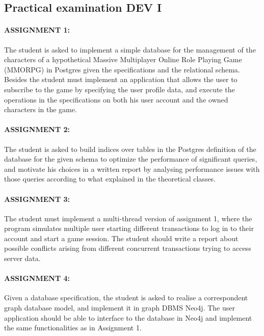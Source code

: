 	\subsection{Practical examination DEV I}
		\paragraph{ASSIGNMENT 1:}
			The student is asked to implement a simple database for the management of the characters of a hypothetical Massive Multiplayer Online Role Playing Game (MMORPG) in Postgres given the specifications and the relational schema. Besides the student must implement an application that allows the user to subscribe to the game by specifying the user profile data, and execute the operations in the specifications on both his user account and the owned characters in the game.

		\paragraph{ASSIGNMENT 2:}
			The student is asked to build indices over tables in the Postgres definition of the database for the given schema to optimize the performance of significant queries, and motivate his choices in a written report by analysing performance issues with those queries according to what explained in the theoretical classes.

		\paragraph{ASSIGNMENT 3:}
			The student must implement a multi-thread version of assignment 1, where the program simulates multiple user starting different transactions to log in to their account and start a game session. The student should write a report about possible conflicts arising from different concurrent transactions trying to access server data.

		\paragraph{ASSIGNMENT 4:}
			Given a database specification, the student is asked to realise a correspondent graph database model, and implement it in graph DBMS Neo4j. The user application should be able to interface to the database in Neo4j and implement the same functionalities as in Assignment 1.
